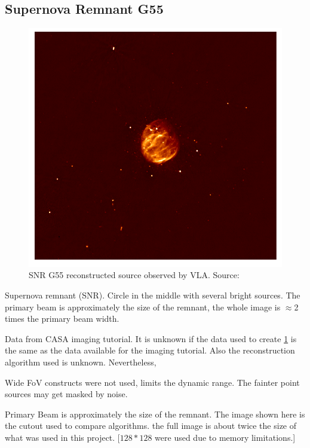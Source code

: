 \subsection{Supernova Remnant G55}
\begin{figure}
	\centering
	\vspace{-15pt}
	\includegraphics[width=\linewidth, trim={230px 230px 200px 200px}, clip]{./chapters/05.results/g55/pic_G55_7.png}
	\caption{SNR G55 reconstructed source observed by VLA. Source:\cite{nraoG55}}
	\label{results:g55:nrao}
	\vspace{-15pt}
\end{figure}

Supernova remnant (SNR). Circle in the middle with several bright sources. The primary beam is approximately the size of the remnant, the whole image is $\approx$2 times the primary beam width.

Data from CASA imaging tutorial\cite{casaImagingGuide}. It is unknown if the data used to create \ref{results:g55:nrao} is the same as the data available for the imaging tutorial. Also the reconstruction algorithm used is unknown. Nevertheless,

Wide FoV constructs were not used, limits the dynamic range. The fainter point sources may get masked by noise.

Primary Beam is approximately the size of the remnant. The image shown here is the cutout used to compare algorithms. the full image is about twice the size of what was used in this project. [$128*128$ were used due to memory limitations.]

